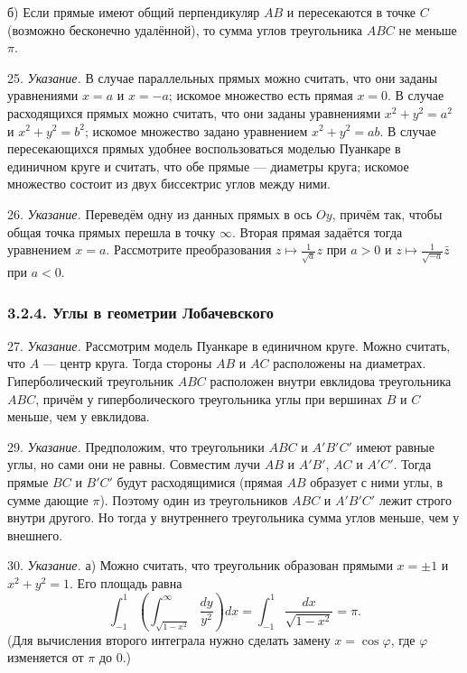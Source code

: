 		б) Если прямые имеют общий перпендикуляр $AB$ и пересекаются в точке $C$ (возможно бесконечно удалённой), то сумма углов треугольника $ABC$ не меньше $\pi$.
 
		25. \textit{Указание.} В случае параллельных прямых можно считать, что они заданы уравнениями $x = a$ и $x = -a$; искомое множество есть прямая $x = 0$. В случае расходящихся прямых можно считать, что они заданы уравнениями $x^2 + y^2 = a^2$ и $x^2 + y^2 = b^2$; искомое множество задано уравнением $x^2 + y^2 = ab$. В случае пересекающихся прямых удобнее воспользоваться моделью Пуанкаре в единичном круге и считать, что обе прямые --- диаметры круга; искомое множество состоит из двух биссектрис углов между ними.
 
		26. \textit{Указание.} Переведём одну из данных прямых в ось $Oy$, причём так, чтобы общая точка прямых перешла в точку $\infty$. Вторая прямая задаётся тогда уравнением $x = a$. Рассмотрите преобразования $z \mapsto \frac{1}{\sqrt{a}} z$ при $a > 0$ и $z \mapsto \frac{1}{\sqrt{-a}} \bar{z}$ при $a < 0$.
 
	\subsubsection{3.2.4. Углы в геометрии Лобачевского}
 	
	27. \textit{Указание.} Рассмотрим модель Пуанкаре в единичном круге. Можно считать, что $A$ --- центр круга. Тогда стороны $AB$ и $AC$ расположены на диаметрах. Гиперболический треугольник $ABC$ расположен внутри евклидова треугольника $ABC$, причём у гиперболического треугольника углы при вершинах $B$ и $C$ меньше, чем у евклидова.
 
	29. \textit{Указание.} Предположим, что треугольники $ABC$ и $A'B'C'$ имеют равные углы, но сами они не равны. Совместим лучи $AB$ и $A'B'$, $AC$ и $A'C'$. Тогда прямые $BC$ и $B'C'$ будут расходящимися (прямая $AB$ образует с ними углы, в сумме дающие $\pi$). Поэтому один из треугольников $ABC$ и $A'B'C'$ лежит строго внутри другого. Но тогда у внутреннего треугольника сумма углов меньше, чем у внешнего.

	30. \textit{Указание.} а) Можно считать, что треугольник образован прямыми $x = \pm 1$ и $x^2 + y^2 = 1$. Его площадь равна
	\[
		\int_{-1}^{1} \left( \int_{\sqrt{1-x^2}}^{\infty} \frac{dy}{y^2} \right) dx = \int_{-1}^{1} \frac{dx}{\sqrt{1 - x^2}} = \pi.
	\]
	(Для вычисления второго интеграла нужно сделать замену $x = \cos\varphi$, где $\varphi$ изменяется от $\pi$ до $0$.)

